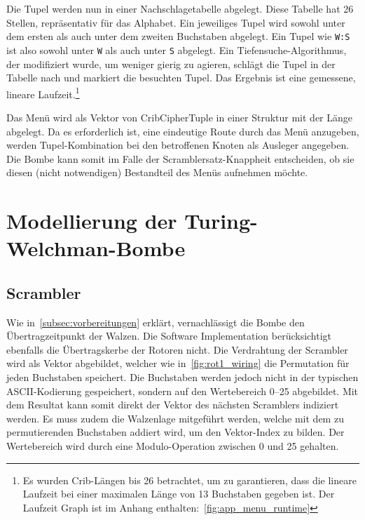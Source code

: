 \noindent

Die Tupel werden nun in einer \glqq Nachschlagetabelle\grqq{} abgelegt.
Diese Tabelle hat 26 Stellen, repräsentativ für das Alphabet.
Ein jeweiliges Tupel wird sowohl unter dem ersten als auch unter dem zweiten Buchstaben abgelegt. 
Ein Tupel wie \texttt{W:S} ist also sowohl unter \texttt{W} als auch unter \texttt{S} abgelegt.
Ein Tiefensuche-Algorithmus, der modifiziert wurde, um weniger \glqq gierig\grqq{} zu agieren, schlägt die Tupel in der Tabelle nach und markiert die besuchten Tupel.
Das Ergebnis ist eine gemessene, lineare Laufzeit.\footnote{Es wurden Crib-Längen bis 26 betrachtet, um zu garantieren, dass die lineare Laufzeit bei einer maximalen Länge von 13 Buchstaben gegeben ist.
Der Laufzeit Graph ist im Anhang enthalten:~\cref{fig:app_menu_runtime}}

Das Menü wird als Vektor von \glqq CribCipherTuple\grqq{} in einer Struktur mit der Länge abgelegt.
Da es erforderlich ist, eine eindeutige \glqq Route\grqq{} durch das Menü anzugeben, werden Tupel-Kombination bei den betroffenen Knoten als Ausleger angegeben. 
Die Bombe kann somit im Falle der \glqq Scramblersatz-Knappheit\grqq{} entscheiden, ob sie diesen (nicht notwendigen) Bestandteil des Menüs aufnehmen möchte.

\section{Modellierung der Turing-Welchman-Bombe}\label{sec:model}
\subsection{Scrambler}\label{subsec:impl_scrambler}
Wie in~\cref{subsec:vorbereitungen} erklärt, vernachlässigt die Bombe den Übertragzeitpunkt der Walzen.
Die Software Implementation berücksichtigt ebenfalls die Übertragskerbe der Rotoren nicht.
Die Verdrahtung der Scrambler wird als Vektor abgebildet, welcher wie in~\cref{fig:rot1_wiring} die Permutation für jeden Buchstaben speichert.
Die Buchstaben werden jedoch nicht in der typischen ASCII-Kodierung gespeichert, sondern auf den Wertebereich 0--25 abgebildet.
Mit dem Resultat kann somit direkt der Vektor des nächsten Scramblers indiziert werden.
Es muss zudem die Walzenlage mitgeführt werden, welche mit dem zu permutierenden Buchstaben addiert wird, um den Vektor-Index zu bilden.
Der Wertebereich wird durch eine Modulo-Operation zwischen 0 und 25 gehalten.

